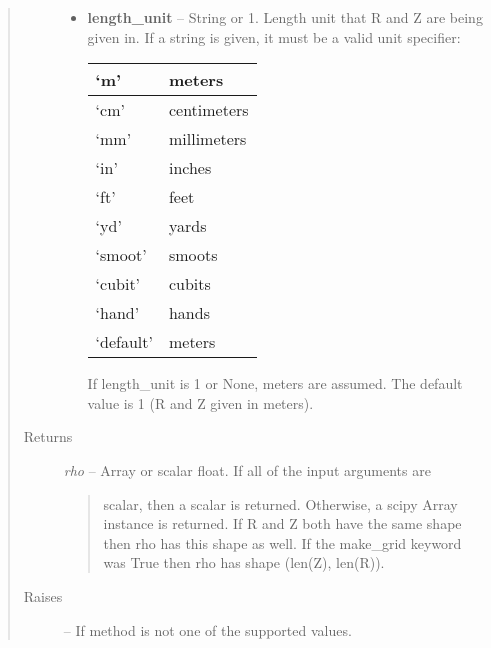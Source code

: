 \documentclass[letterpaper,10pt,english]{sphinxmanual}
\begin{document}
\begin{fulllineitems}
\begin{fulllineitems}
\begin{quote}
\begin{description}
\begin{itemize}
\item {} 
\textbf{length\_unit} --
String or 1.
Length unit that R and Z are being given
in. If a string is given, it must be a valid unit specifier:

\begin{tabulary}{\linewidth}{|L|L|}
\hline

`m'
 & 
meters
\\\hline

`cm'
 & 
centimeters
\\\hline

`mm'
 & 
millimeters
\\\hline

`in'
 & 
inches
\\\hline

`ft'
 & 
feet
\\\hline

`yd'
 & 
yards
\\\hline

`smoot'
 & 
smoots
\\\hline

`cubit'
 & 
cubits
\\\hline

`hand'
 & 
hands
\\\hline

`default'
 & 
meters
\\\hline
\end{tabulary}


If length\_unit is 1 or None, meters are assumed. The default
value is 1 (R and Z given in meters).

\end{itemize}

\item[{Returns}] \leavevmode

\emph{rho} --
Array or scalar float. If all of the input arguments are
\begin{quote}

scalar, then a scalar is returned. Otherwise, a scipy Array
instance is returned. If R and Z both have the same shape then
rho has this shape as well. If the make\_grid keyword was True
then rho has shape (len(Z), len(R)).
\end{quote}


\item[{Raises }] \leavevmode
{} -- 
If method is not one of the supported values.

\end{description}\end{quote}

\end{fulllineitems}
\end{fulllineitems}
\end{document}
